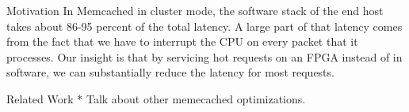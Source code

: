 \begin{block}{Motivation}
In Memcached in cluster mode, the software stack of the end host takes about
86-95 percent of the total latency. A large part of that latency comes from the
fact that we have to interrupt the CPU on every packet that it processes. Our
insight is that by servicing hot requests on an FPGA instead of in software, we
can substantially reduce the latency for most requests.

\end{block}

\vspace{1ex}

\begin{block}{Related Work}
* Talk about other memecached optimizations.


\end{block}
